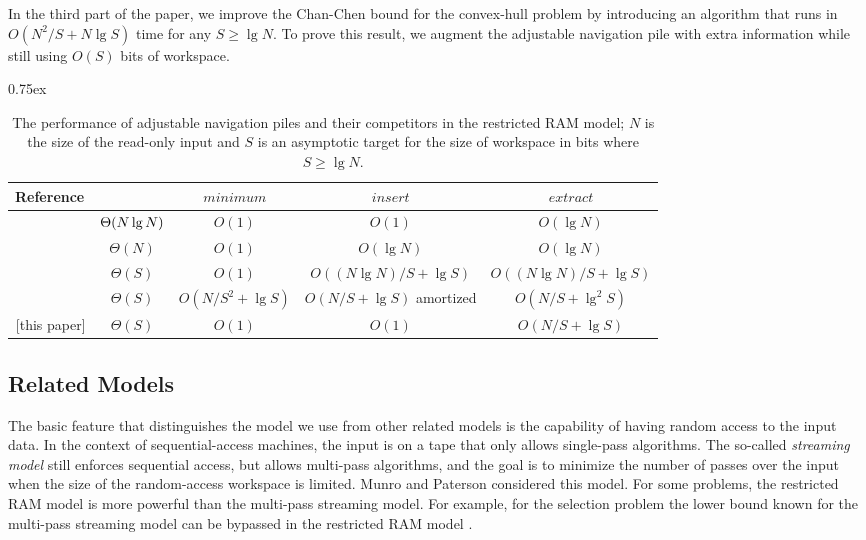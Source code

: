 \documentclass[final,onetabnum,onefignum,onethmnum]{siamltex}
\newcommand{\Minimum}{\mbox{$\mathit{minimum}$}}
\newcommand{\Insert}{\mbox{$\mathit{insert}$}}
\newcommand{\Extract}{\mbox{$\mathit{extract}$}}
\newcommand{\ylatyhjaa}{\mbox{${}^{\mbox{\rule{0cm}{1.25ex}}}$}}
\begin{document}
In the third part of the paper, we improve the Chan-Chen bound for the
convex-hull problem by introducing an algorithm that runs in 
$O(N^2/S + N \lg S)$ time for any $S \geq \lg N$.  To prove this
result, we augment the adjustable navigation pile with extra
information while still using $O(S)$ bits of workspace.

\begin{table}[tb!]
\caption{The performance of adjustable navigation piles and their
  competitors in the restricted RAM model; $N$ is
  the size of the read-only input and $S$ is an asymptotic target for
  the size of workspace in bits where $S \geq \lg N$.}
\label{table:queues}
\begin{center}
\begin{small}
\tabcolsep0.75ex
\begin{tabular}{|c|c|c|c|c|}
\hline
\textbf{Reference}\ylatyhjaa & \textbf{Space\strut} & \Minimum{} &
\Insert{} & \Extract{}\\ 
\hline
\cite{CMP88}\ylatyhjaa{} & $\Theta(N \lg N)\strut$ & 
$O(1)$ & $O(1)$ & $O(\lg N)$\\
\cite{KV03} & $\Theta(N)$ & 
$O(1)$ & $O(\lg N)$ & $O(\lg N)$\\
\cite{Fre87} & $\Theta(S)$ & $O(1)$ & $O((N \lg N)/S +
\lg S)$ & $O((N\lg N)/S + \lg S)$\\
\cite{PR98} & $\Theta(S)$ &
$O(N/S^2 + \lg S)$ & $O(N/S + \lg S)$ amortized & $O(N/S + \lg^2 S)$\\
{}[this paper] & $\Theta(S)$ &
$O(1)$ & $O(1)$ & $O(N/S + \lg S)$\\
\hline
\end{tabular}
\end{small}
\end{center}
\end{table}


\subsection{Related Models} The basic feature that distinguishes the
model we use from other related models is the capability of having
random access to the input data. In the context of sequential-access
machines, the input is on a tape that only allows single-pass
algorithms. The so-called \emph{streaming model} still enforces
sequential access, but allows multi-pass algorithms, and the goal is
to minimize the number of passes over the input when the size of the
random-access workspace is limited. Munro and Paterson \cite{MP80}
considered this model. For some problems, the restricted RAM model is
more powerful than the multi-pass streaming model. For example, for
the selection problem the lower bound known for the multi-pass
streaming model \cite{Cha10} can be bypassed in the restricted RAM
model \cite{EJKS14}.
\end{document}
